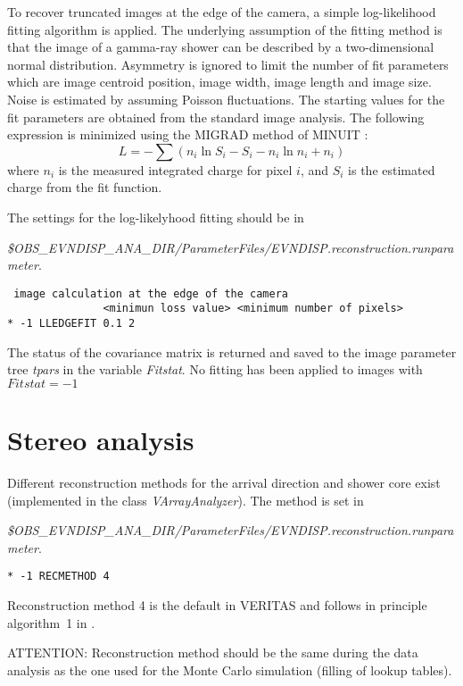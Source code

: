 \documentclass[titlepage,a4paper,twoside,11pt]{report}
\begin{document}
To recover truncated images at the edge of the camera, a simple log-likelihood fitting algorithm is applied. The underlying assumption of the fitting method is that the image of a gamma-ray shower can be described by a two-dimensional normal distribution. Asymmetry is ignored to limit the number of fit parameters which are image centroid position, image width, image length and image size. Noise is estimated by assuming Poisson fluctuations. The starting values for the fit parameters are obtained from the standard image analysis. The following expression is minimized using the MIGRAD method of MINUIT \cite{MINUIT}: 
\begin{equation}
L = - \sum (n_i \ln S_i - S_i - n_i \ln n_i + n_i)
\end{equation}
where $n_i$ is the measured integrated charge for pixel $i$, and $S_i$ is the estimated charge from the fit function. 


The settings for the log-likelyhood fitting should be in 

{\it \$OBS\_EVNDISP\_ANA\_DIR/ParameterFiles/EVNDISP.reconstruction.runparameter}.

\begin{lstlisting}
 image calculation at the edge of the camera 
               <minimun loss value> <minimum number of pixels>
* -1 LLEDGEFIT 0.1 2
\end{lstlisting}

The status of the covariance matrix is returned and saved to the image parameter tree {\it tpars} in the variable {\it Fitstat}. 
No fitting has been applied to images with $Fitstat=-1$ 


\section{Stereo analysis}

Different reconstruction methods for the arrival direction and shower core exist (implemented in the class {\it VArrayAnalyzer}). The method is set in 

{\it \$OBS\_EVNDISP\_ANA\_DIR/ParameterFiles/EVNDISP.reconstruction.runparameter}. 

\begin{lstlisting}
* -1 RECMETHOD 4
\end{lstlisting}

Reconstruction method 4 is the default in VERITAS and follows in principle algorithm~1 in \cite{1999APh....12..135H}.

ATTENTION: Reconstruction method should be the same during the data analysis as the one used for the Monte Carlo simulation (filling of lookup tables). 
\end{document}
